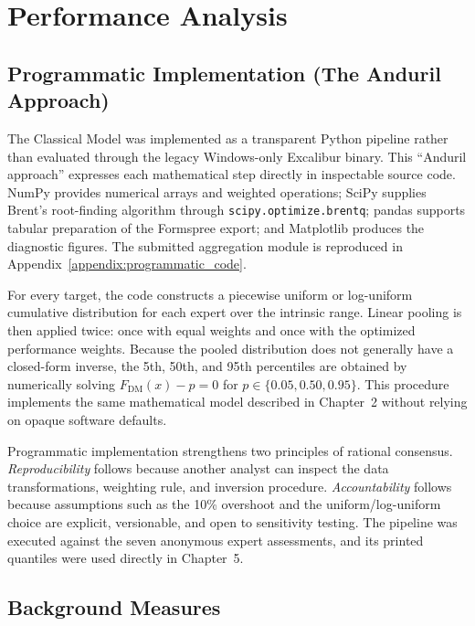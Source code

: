 \chapter{Performance Analysis}
\label{chapter:performance_analysis}

\section{Programmatic Implementation (The Anduril Approach)}
\label{sec:programmatic_implementation}

The Classical Model was implemented as a transparent Python pipeline rather than evaluated through the legacy Windows-only Excalibur binary. This ``Anduril approach'' expresses each mathematical step directly in inspectable source code. NumPy provides numerical arrays and weighted operations; SciPy supplies Brent's root-finding algorithm through \texttt{scipy.optimize.brentq}; pandas supports tabular preparation of the Formspree export; and Matplotlib produces the diagnostic figures. The submitted aggregation module is reproduced in Appendix~\ref{appendix:programmatic_code}.

For every target, the code constructs a piecewise uniform or log-uniform cumulative distribution for each expert over the intrinsic range. Linear pooling is then applied twice: once with equal weights and once with the optimized performance weights. Because the pooled distribution does not generally have a closed-form inverse, the 5th, 50th, and 95th percentiles are obtained by numerically solving $F_{\mathrm{DM}}(x)-p=0$ for $p\in\{0.05,0.50,0.95\}$. This procedure implements the same mathematical model described in Chapter~2 without relying on opaque software defaults.

Programmatic implementation strengthens two principles of rational consensus. \textit{Reproducibility} follows because another analyst can inspect the data transformations, weighting rule, and inversion procedure. \textit{Accountability} follows because assumptions such as the 10\% overshoot and the uniform/log-uniform choice are explicit, versionable, and open to sensitivity testing. The pipeline was executed against the seven anonymous expert assessments, and its printed quantiles were used directly in Chapter~5.

\section{Background Measures}
\label{sec:background_measures}

